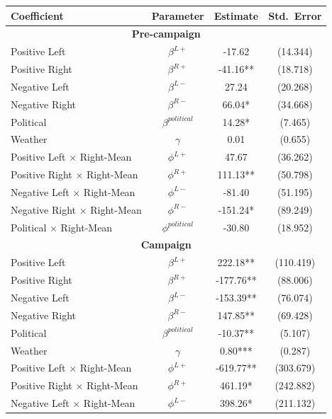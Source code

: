\documentclass[12pt]{article}
\begin{document}
	
	\begin{table}[!htb]
		\label{tab:logit}
		\centering
		\begin{threeparttable}
			\begin{tabular}{lccc}
				\hline
				\textbf{Coefficient} & \textbf{Parameter} & \textbf{Estimate} & \textbf{Std.\ Error} \\
				\hline
				\hline
				\multicolumn{4}{c}{\textbf{Pre-campaign}} \\
				\hline
				Positive Left & $\beta^{L+}$ & -17.62 & (14.344) \\
				Positive Right & $\beta^{R+}$ & -41.16** & (18.718) \\
				Negative Left & $\beta^{L-}$ & 27.24 & (20.268) \\
				Negative Right & $\beta^{R-}$ & 66.04* & (34.668) \\
				Political & $\beta^{political}$ & 14.28* & (7.465) \\
				Weather & $\gamma$ & 0.01 & (0.655) \\
				Positive Left $\times$ Right-Mean & $\phi^{L+}$ & 47.67 & (36.262) \\
				Positive Right $\times$ Right-Mean & $\phi^{R+}$ & 111.13** & (50.798) \\
				Negative Left $\times$ Right-Mean & $\phi^{L-}$ & -81.40 & (51.195) \\
				Negative Right $\times$ Right-Mean & $\phi^{R-}$ & -151.24* & (89.249) \\
				Political $\times$ Right-Mean & $\phi^{political}$ & -30.80 & (18.952) \\
				\hline
				\hline
				\multicolumn{4}{c}{\textbf{Campaign}} \\
				\hline
				Positive Left & $\beta^{L+}$ & 222.18** & (110.419) \\
				Positive Right & $\beta^{R+}$ & -177.76** & (88.006) \\
				Negative Left & $\beta^{L-}$ & -153.39** & (76.074) \\
				Negative Right & $\beta^{R-}$ & 147.85** & (69.428) \\
				Political & $\beta^{political}$ & -10.37** & (5.107) \\
				Weather & $\gamma$ & 0.80*** & (0.287) \\
				Positive Left $\times$ Right-Mean & $\phi^{L+}$ & -619.77** & (303.679) \\
				Positive Right $\times$ Right-Mean & $\phi^{R+}$ & 461.19* & (242.882) \\
				Negative Left $\times$ Right-Mean & $\phi^{L-}$ & 398.26* & (211.132) \\

\end{tabular}
\end{threeparttable}
\end{table}
\end{document}
